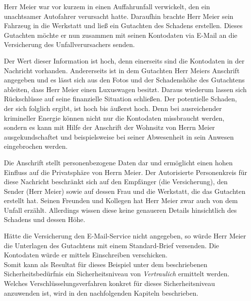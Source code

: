 \documentclass  [paper=a4,
				fontsize=12pt,
				listof=totoc,
				bibliography=totoc
				]{scrreprt}
\begin{document}
		Herr Meier war vor kurzem in einen Auffahrunfall verwickelt, den ein unachtsamer Autofahrer verursacht hatte. Daraufhin brachte Herr Meier sein Fahrzeug in die Werkstatt und ließ ein Gutachten des Schadens erstellen. Dieses Gutachten möchte er nun zusammen mit seinen Kontodaten via E-Mail an die Versicherung des Unfallverursachers senden. 
		
		Der Wert dieser Information ist hoch, denn einerseits sind die Kontodaten in der Nachricht vorhanden. Andererseits ist in dem Gutachten Herr Meiers Anschrift angegeben und es lässt sich aus den Fotos und der Schadenshöhe des Gutachtens ableiten, dass Herr Meier einen Luxuswagen besitzt. Daraus wiederum lassen sich Rückschlüsse auf seine finanzielle Situation schließen. Der potentielle Schaden, der sich folglich ergibt, ist hoch bis äußerst hoch. Denn bei ausreichender krimineller Energie können nicht nur die Kontodaten missbraucht werden, sondern es kann mit Hilfe der Anschrift der Wohnsitz von Herrn Meier ausgekundschaftet und beispielsweise bei seiner Abwesenheit in sein Anwesen eingebrochen werden. 
		
		Die Anschrift stellt personenbezogene Daten dar und ermöglicht einen hohen Einfluss auf die Privatsphäre von Herrn Meier.
		Der Autorisierte Personenkreis für diese Nachricht beschränkt sich auf den Empfänger (die Versicherung), den Sender (Herr Meier) sowie auf dessen Frau und die Werkstatt, die das Gutachten erstellt hat. Seinen Freunden und Kollegen hat Herr Meier zwar auch von dem Unfall erzählt. Allerdings wissen diese keine genaueren Details hinsichtlich des Schadens und dessen Höhe.
		
		Hätte die Versicherung den E-Mail-Service nicht angegeben, so würde Herr Meier die Unterlagen des Gutachtens mit einem Standard-Brief versenden. Die Kontodaten würde er mittels Einschreiben verschicken.
		\bigskip\\
		Somit kann als Resultat für dieses Beispiel unter dem beschriebenen Sicherheitsbedürfnis ein Sicherheitsniveau von \textit{Vertraulich} ermittelt werden. Welches Verschlüsselungsverfahren konkret für dieses Sicherheitsniveau anzuwenden ist, wird in den nachfolgenden Kapiteln beschrieben.
		
\end{document}
